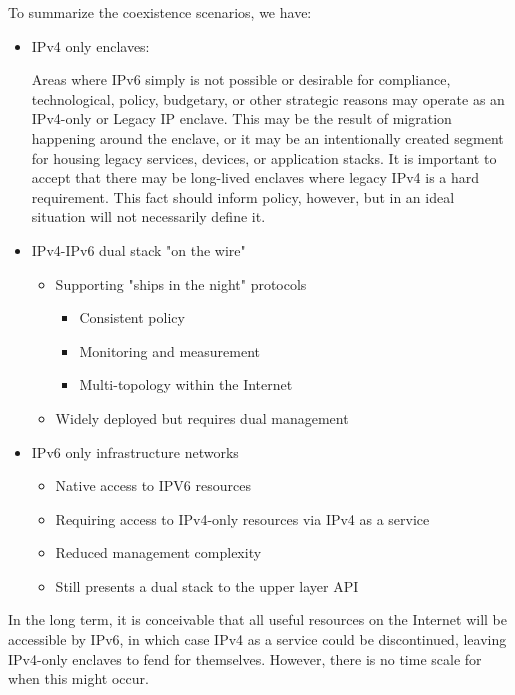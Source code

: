 \documentclass[
]{article}
\providecommand{\tightlist}{%
  \setlength{\itemsep}{0pt}\setlength{\parskip}{0pt}}
\begin{document}
To summarize the coexistence scenarios, we have:

\begin{itemize}
\item
  IPv4 only enclaves:

  Areas where IPv6 simply is not possible or desirable for compliance,
  technological, policy, budgetary, or other strategic reasons may
  operate as an IPv4-only or Legacy IP enclave. This may be the result
  of migration happening around the enclave, or it may be an
  intentionally created segment for housing legacy services, devices, or
  application stacks. It is important to accept that there may be
  long-lived enclaves where legacy IPv4 is a hard requirement. This fact
  should inform policy, however, but in an ideal situation will not
  necessarily define it.
\item
  IPv4-IPv6 dual stack "on the wire"

  \begin{itemize}
  \tightlist
  \item
    Supporting "ships in the night" protocols

    \begin{itemize}
    \tightlist
    \item
      Consistent policy
    \item
      Monitoring and measurement
    \item
      Multi-topology within the Internet
    \end{itemize}
  \item
    Widely deployed but requires dual management
  \end{itemize}
\item
  IPv6 only infrastructure networks

  \begin{itemize}
  \tightlist
  \item
    Native access to IPV6 resources
  \item
    Requiring access to IPv4-only resources via IPv4 as a service
  \item
    Reduced management complexity
  \item
    Still presents a dual stack to the upper layer API
  \end{itemize}
\end{itemize}

In the long term, it is conceivable that all useful resources on the
Internet will be accessible by IPv6, in which case IPv4 as a service
could be discontinued, leaving IPv4-only enclaves to fend for
themselves. However, there is no time scale for when this might occur.
\end{document}
